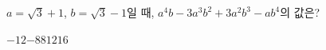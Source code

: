 $a=\sqrt{3}+1$, $b=\sqrt{3}-1$일 때, $a^4b-3a^3b^2+3a^2b^3-ab^4$의 값은?
\begin{choices32}{$-12$}{$-8$}{$8$}{$12$}{$16$}\end{choices32}
